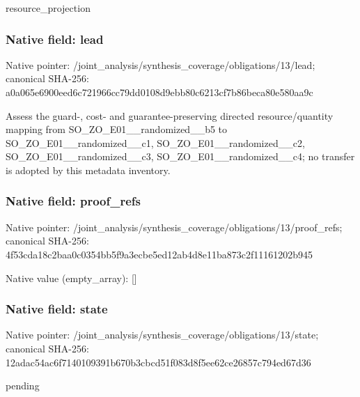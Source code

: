 \documentclass[10pt,a4paper]{article}
\begin{document}
\begingroup\raggedright\sloppy resource\_\allowbreak{}projection\par\endgroup

\subsubsection{Native field: lead}
Native pointer: /joint\_\allowbreak{}analysis/synthesis\_\allowbreak{}coverage/obligations/13/lead; canonical SHA-256: a0a065e6900eed6c721966cc79dd0108d9ebb80c6213cf7b86beca80e580aa9c

\begingroup\raggedright\sloppy Assess the guard-,\allowbreak{} cost- and guarantee-preserving directed resource/\allowbreak{}quantity mapping from SO\_\allowbreak{}ZO\_\allowbreak{}E01\_\allowbreak{}\_\allowbreak{}randomized\_\allowbreak{}\_\allowbreak{}b5 to SO\_\allowbreak{}ZO\_\allowbreak{}E01\_\allowbreak{}\_\allowbreak{}randomized\_\allowbreak{}\_\allowbreak{}c1,\allowbreak{} SO\_\allowbreak{}ZO\_\allowbreak{}E01\_\allowbreak{}\_\allowbreak{}randomized\_\allowbreak{}\_\allowbreak{}c2,\allowbreak{} SO\_\allowbreak{}ZO\_\allowbreak{}E01\_\allowbreak{}\_\allowbreak{}randomized\_\allowbreak{}\_\allowbreak{}c3,\allowbreak{} SO\_\allowbreak{}ZO\_\allowbreak{}E01\_\allowbreak{}\_\allowbreak{}randomized\_\allowbreak{}\_\allowbreak{}c4;\allowbreak{} no transfer is adopted by this metadata inventory.\par\endgroup

\subsubsection{Native field: proof\_\allowbreak{}refs}
Native pointer: /joint\_\allowbreak{}analysis/synthesis\_\allowbreak{}coverage/obligations/13/proof\_\allowbreak{}refs; canonical SHA-256: 4f53cda18c2baa0c0354bb5f9a3ecbe5ed12ab4d8e11ba873c2f11161202b945

Native value (empty\_\allowbreak{}array): []

\subsubsection{Native field: state}
Native pointer: /joint\_\allowbreak{}analysis/synthesis\_\allowbreak{}coverage/obligations/13/state; canonical SHA-256: 12adac54ac6f7140109391b670b3cbcd51f083d8f5ee62ce26857c794ed67d36

\begingroup\raggedright\sloppy pending\par\endgroup
\end{document}

